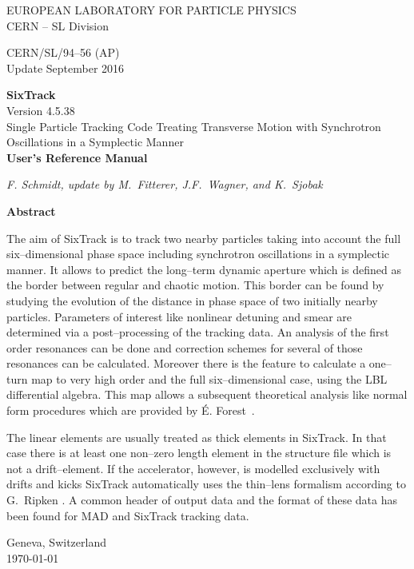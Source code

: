 \documentclass[a4paper,11pt]{report}
\begin{document}

\begin{titlepage}
\begin{center}\normalsize
  EUROPEAN LABORATORY FOR PARTICLE PHYSICS \\
  CERN -- SL Division
\end{center}
\vspace*{2mm}
\begin{flushright}
  CERN/SL/94--56  (AP) \\
  Update September 2016
\end{flushright}
\begin{center}\LARGE
  {\bf SixTrack} \\
  Version 4.5.38 \\
  {Single Particle Tracking Code Treating Transverse Motion with Synchrotron Oscillations in a Symplectic Manner} \\
  \vspace*{2mm} {\bf User's Reference Manual}
\end{center}
\begin{center}\em
  F. Schmidt, update by M.~Fitterer, J.F.~Wagner, and K.~Sjobak
\end{center}
\begin{center}\large
  {\bf Abstract} \\
\end{center}
The aim of SixTrack is to track two nearby particles taking into
account the full six--dimensional phase space including synchrotron
oscillations in a symplectic manner. It allows to predict the
long--term dynamic aperture which is defined as the border between
regular and chaotic motion. This border can be found by studying the
evolution of the distance in phase space of two initially nearby
particles.  Parameters of interest like nonlinear detuning and smear
are determined via a post--processing of the tracking data.  An
analysis of the first order resonances can be done and correction
schemes for several of those resonances can be calculated.  Moreover
there is the feature to calculate a one--turn map to very high order
and the full six--dimensional case, using the LBL differential
algebra. This map allows a subsequent theoretical 
analysis like normal form procedures which are provided by \'{E}.
Forest~\cite{DALIE}.

The linear elements are usually treated as thick elements in
SixTrack\@.  In that case there is at least one non--zero length
element in the structure file which is not a drift--element.  If the
accelerator, however, is modelled exclusively with drifts and kicks
SixTrack automatically uses the thin--lens formalism according to
G.~Ripken \cite{Ripken95}. A common header of output
data and the format of these data has been found for MAD and SixTrack
tracking data.

\vfill
\begin{center}
  Geneva, Switzerland \\
  \today
\end{center}

\end{titlepage}
\end{document}
